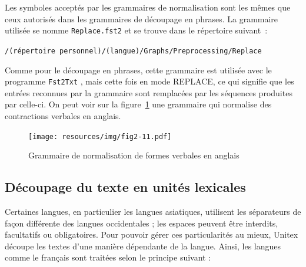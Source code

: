 \bigskip
\noindent Les symboles acceptés par les grammaires de normalisation sont les mêmes que ceux
autorisés dans les grammaires de découpage en phrases. La grammaire utilisée se nomme
\verb+Replace.fst2+ et se trouve dans le répertoire suivant~:

\bigskip \verb+/(répertoire personnel)/(langue)/Graphs/Preprocessing/Replace+

\bigskip
\noindent Comme pour le découpage en phrases, cette grammaire est utilisée avec le programme
\verb+Fst2Txt+ , mais cette fois en
mode REPLACE, ce qui signifie que les entrées reconnues par la grammaire sont remplacées par les
séquences produites par celle-ci. On peut voir sur la figure~\ref{fig-normalization-grammar} une
grammaire qui normalise des contractions verbales en anglais.

\begin{figure}[!p]
\begin{center}
\texttt{[image: resources/img/fig2-11.pdf]}
\caption{Grammaire de normalisation de formes verbales en anglais\label{fig-normalization-grammar}}
\end{center}
\end{figure}



\subsection{Découpage du texte en unités lexicales}
\label{tokenization}
Certaines langues, en particulier les langues asiatiques, utilisent les séparateurs de façon
différente des langues occidentales ; les espaces peuvent être interdits, facultatifs ou
obligatoires. Pour pouvoir gérer ces particularités au mieux, Unitex découpe les textes d’une
manière dépendante de la langue. Ainsi, les langues comme le français sont traitées selon le
principe suivant :

